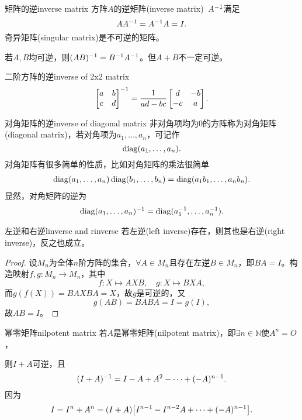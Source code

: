 \begin{definition}{矩阵的逆}{inverse matrix}
	方阵$A$的逆矩阵(inverse matrix)~$A^{-1}$满足
	\[
		AA^{-1}=A^{-1} A=I.
	\]
	奇异矩阵(singular matrix)是不可逆的矩阵。
\end{definition}
若$A,B$均可逆，则$(AB)^{-1}=B^{-1} A^{-1}$。但$A+B$不一定可逆。
\begin{example}{二阶方阵的逆}{inverse of 2x2 matrix}
	\begin{equation}
		\begin{bmatrix}
			a&b\\c&d
		\end{bmatrix}^{-1}=\frac1{ad-bc}
		\begin{bmatrix}
			d&-b\\
			-c&a
		\end{bmatrix}.
	\end{equation}
\end{example}
\begin{example}{对角矩阵的逆}{inverse of diagonal matrix}
	非对角项均为0的方阵称为对角矩阵(diagonal matrix)，若对角项为$a_1,\ldots,a_n$，可记作
	\[
		\operatorname{diag}(a_1,\ldots,a_n).
	\]
	对角矩阵有很多简单的性质，比如对角矩阵的乘法很简单
	\begin{align}
		\operatorname{diag}(a_1,\ldots,a_n)\operatorname{diag}(b_1,\ldots,b_n)=\operatorname{diag}(a_1b_1,\ldots,a_nb_n).
	\end{align}
	显然，对角矩阵的逆为
	\begin{align}
		\operatorname{diag}(a_1,\ldots,a_n)^{-1}=\operatorname{diag}(a_1^{-1},\ldots,a_n^{-1}).
	\end{align}
\end{example}
\begin{theorem}{左逆和右逆}{linverse and rinverse}
	若左逆(left inverse)存在，则其也是右逆(right inverse)，反之也成立。
\end{theorem}
\begin{proof}
	设$M_n$为全体$n$阶方阵的集合，$\forall A\in M_n$且存在左逆$B\in M_n$，即$BA=I$。构造映射$f,g: M_n\to M_n$，其中
	\[
		f:X\mapsto AXB,\quad g:X\mapsto BXA,
	\]
	而$g(f(X))=BAXBA=X$，故$g$是可逆的，又
	\[
		g(AB)=BABA=I=g(I),
	\]
	故$AB=I$。
\end{proof}
\begin{example}{幂零矩阵}{nilpotent matrix}
	若$A$是幂零矩阵(nilpotent matrix)，即$\exists n\in\mathbb N$使$A^n=O$，
	
	则$I+A$可逆，且
	\[
		(I+A)^{-1}=I-A+A^2-\cdots+(-A)^{n-1}.
	\]
	因为
	\[
		I=I^n+A^n=(I+A)\bigl[I^{n-1}-I^{n-2}A+\cdots+(-A)^{n-1}\bigr].
	\]
\end{example}
